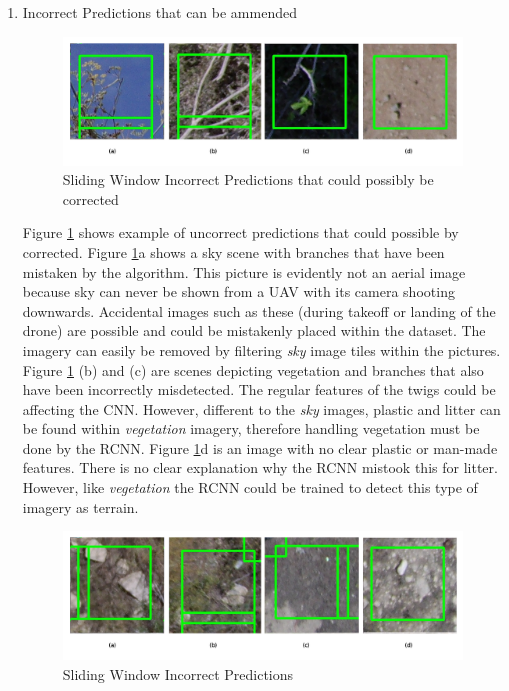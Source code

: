 \documentclass{IEEEtran}
\begin{document}
\begin{enumerate}
\item Incorrect Predictions that can be ammended
\begin{figure}[H]
\centering
\includegraphics[scale=0.4]{images/test1-correctable.png}
\caption{Sliding Window Incorrect Predictions that could possibly be corrected}
\label{fig:test1correctable}
\end{figure}

Figure \ref{fig:test1correctable} shows example of uncorrect predictions that could possible by corrected. Figure \ref{fig:test1correctable}a shows a sky scene with branches that have been mistaken by the algorithm. This picture is evidently not an aerial image because sky can never be shown from a UAV with its camera shooting downwards. Accidental images such as these (during takeoff or landing of the drone) are possible and could be mistakenly placed within the dataset. The imagery can easily be removed by filtering \textit{sky} image tiles within the pictures. Figure \ref{fig:test1correctable} (b) and (c) are scenes  depicting vegetation and branches that also have been incorrectly misdetected. The regular features of the twigs could be affecting the CNN. However, different to the \textit{sky} images, plastic and litter can be found within \textit{vegetation} imagery, therefore handling vegetation must be done by the RCNN. Figure \ref{fig:test1correctable}d is an image with no clear plastic or man-made features. There is no clear explanation why the RCNN mistook this for litter. However, like \textit{vegetation} the RCNN could be trained to detect this type of imagery as terrain.

\begin{figure}[H]
\centering
\includegraphics[scale=0.4]{images/test1-unkown.png}
\caption{Sliding Window Incorrect Predictions}
\label{figcorrectable2}
\end{figure}


\end{enumerate}
\end{document}
